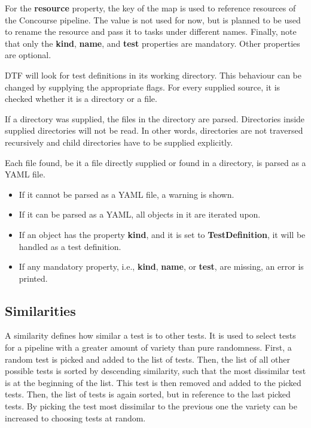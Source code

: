For the \textbf{resource} property, the key of the map is used to reference resources of the Concourse pipeline.
The value is not used for now, but is planned to be used to rename the resource and pass it to tasks under different names.
Finally, note that only the \textbf{kind}, \textbf{name}, and \textbf{test} properties are mandatory.
Other properties are optional.

DTF will look for test definitions in its working directory.
This behaviour can be changed by supplying the appropriate flags.
For every supplied source, it is checked whether it is a directory or a file.

If a directory was supplied, the files in the directory are parsed.
Directories inside supplied directories will not be read.
In other words, directories are not traversed recursively and child directories have to be supplied explicitly.

Each file found, be it a file directly supplied or found in a directory, is parsed as a YAML file.
\begin{itemize}
  \item If it cannot be parsed as a YAML file, a warning is shown.
  \item If it can be parsed as a YAML, all objects in it are iterated upon.
  \item If an object has the property \textbf{kind}, and it is set to \textbf{TestDefinition}, it will be handled as a test definition.
  \item If any mandatory property, i.e., \textbf{kind}, \textbf{name}, or \textbf{test}, are missing, an error is printed.
\end{itemize}

\subsection{Similarities}\label{subsec:similarities}

A similarity defines how similar a test is to other tests.
It is used to select tests for a pipeline with a greater amount of variety than pure randomness.
First, a random test is picked and added to the list of tests.
Then, the list of all other possible tests is sorted by descending similarity, such that the most dissimilar test is at the beginning of the list.
This test is then removed and added to the picked tests.
Then, the list of tests is again sorted, but in reference to the last picked tests.
By picking the test most dissimilar to the previous one the variety can be increased to choosing tests at random.

